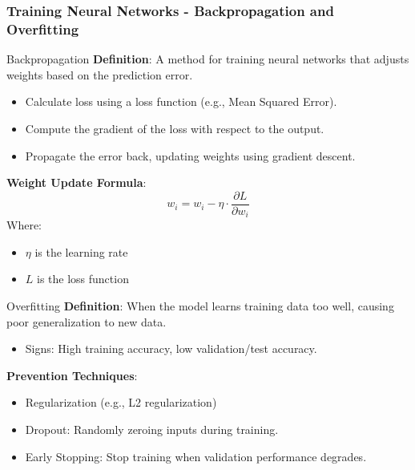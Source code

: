 \documentclass[aspectratio=169]{beamer}
\begin{document}
\begin{frame}[fragile]
    \frametitle{Training Neural Networks - Backpropagation and Overfitting}
    \begin{block}{Backpropagation}
        \textbf{Definition}: A method for training neural networks that adjusts weights based on the prediction error.
        \begin{itemize}
            \item Calculate loss using a loss function (e.g., Mean Squared Error).
            \item Compute the gradient of the loss with respect to the output.
            \item Propagate the error back, updating weights using gradient descent.
        \end{itemize}
        
        \textbf{Weight Update Formula}:
        \begin{equation}
            w_i = w_i - \eta \cdot \frac{\partial L}{\partial w_i}
        \end{equation}
        Where:
        \begin{itemize}
            \item \( \eta \) is the learning rate
            \item \( L \) is the loss function
        \end{itemize}
    \end{block}

    \begin{block}{Overfitting}
        \textbf{Definition}: When the model learns training data too well, causing poor generalization to new data.
        \begin{itemize}
            \item Signs: High training accuracy, low validation/test accuracy.
        \end{itemize}
        
        \textbf{Prevention Techniques}:
        \begin{itemize}
            \item Regularization (e.g., L2 regularization)
            \item Dropout: Randomly zeroing inputs during training.
            \item Early Stopping: Stop training when validation performance degrades.
        \end{itemize}
    \end{block}
\end{frame}
\end{document}
